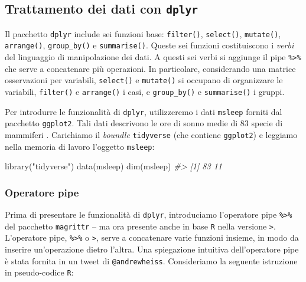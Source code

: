 \documentclass[
  10pt,
  italian,
  a4paper,
  extrafontsizes,onecolumn,openright
  ]{memoir}
\newenvironment{Shaded}{\begin{snugshade}}{\end{snugshade}}
\newcommand{\CommentTok}[1]{\textcolor[rgb]{0.56,0.35,0.01}{\textit{#1}}}
\newcommand{\FunctionTok}[1]{\textcolor[rgb]{0.00,0.00,0.00}{#1}}
\newcommand{\NormalTok}[1]{#1}
\newcommand{\StringTok}[1]{\textcolor[rgb]{0.31,0.60,0.02}{#1}}
\begin{document}
\hypertarget{trattamento-dei-dati-con-dplyr}{%
\subsection{\texorpdfstring{Trattamento dei dati con \texttt{dplyr}}{Trattamento dei dati con dplyr}}\label{trattamento-dei-dati-con-dplyr}}

Il pacchetto \texttt{dplyr} include sei funzioni base: \texttt{filter()}, \texttt{select()}, \texttt{mutate()}, \texttt{arrange()}, \texttt{group\_by()} e \texttt{summarise()}. Queste sei funzioni costituiscono i \emph{verbi} del linguaggio di manipolazione dei dati. A questi sei verbi si aggiunge il pipe \texttt{\%\textgreater{}\%} che serve a concatenare più operazioni. In particolare, considerando una matrice osservazioni per variabili, \texttt{select()} e \texttt{mutate()} si occupano di organizzare le variabili, \texttt{filter()} e \texttt{arrange()} i casi, e \texttt{group\_by()} e \texttt{summarise()} i gruppi.

Per introdurre le funzionalità di \texttt{dplyr}, utilizzeremo i dati \texttt{msleep} forniti dal pacchetto \texttt{ggplot2}. Tali dati descrivono le ore di sonno medie di 83 specie di mammiferi \autocite{savage2007scaling}. Carichiamo il \emph{boundle} \texttt{tidyverse} (che contiene \texttt{ggplot2}) e leggiamo nella memoria di lavoro l'oggetto \texttt{msleep}:

\begin{Shaded}
\begin{Highlighting}[]
\FunctionTok{library}\NormalTok{(}\StringTok{"tidyverse"}\NormalTok{)}
\FunctionTok{data}\NormalTok{(msleep)}
\FunctionTok{dim}\NormalTok{(msleep)}
\CommentTok{\#\textgreater{} [1] 83 11}
\end{Highlighting}
\end{Shaded}

\hypertarget{operatore-pipe}{%
\subsubsection{Operatore pipe}\label{operatore-pipe}}

Prima di presentare le funzionalità di \texttt{dplyr}, introduciamo l'operatore pipe \texttt{\%\textgreater{}\%} del pacchetto \texttt{magrittr} -- ma ora presente anche in base \texttt{R} nella versione \texttt{\textbar{}\textgreater{}}. L'operatore pipe, \texttt{\%\textgreater{}\%} o \texttt{\textbar{}\textgreater{}}, serve a concatenare varie funzioni insieme, in modo da inserire un'operazione dietro l'altra. Una spiegazione intuitiva dell'operatore pipe è stata fornita in un tweet di \texttt{@andrewheiss}. Consideriamo la seguente istruzione in pseudo-codice \texttt{R}:
\end{document}
